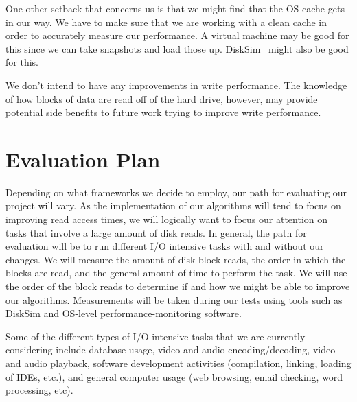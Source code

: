 \documentclass[letterpaper,twocolumn,10pt]{article}
\begin{document}
One other setback that concerns us is that we might find that the OS cache gets in our way.  We have to make sure that we are working with a clean cache in order to accurately measure our performance.  A virtual machine may be good for this since we can take snapshots and load those up.  DiskSim~\cite{DiskSimManual} might also be good for this.

We don't intend to have any improvements in write performance.  The knowledge of how blocks of data are read off of the hard drive, however, may provide potential side benefits to future work trying to improve write performance.

\section{Evaluation Plan}

Depending on what frameworks we decide to employ, our path for evaluating our project will vary.  As the implementation of our algorithms will tend to focus on improving read access times, we will logically want to focus our attention on tasks that involve a large amount of disk reads.  In general, the path for evaluation will be to run different I/O intensive tasks with and without our changes.  We will measure the amount of disk block reads, the order in which the blocks are read, and the general amount of time to perform the task.  We will use the order of the block reads to determine if and how we might be able to improve our algorithms.  Measurements will be taken during our tests using tools such as DiskSim and OS-level performance-monitoring software.

Some of the different types of I/O intensive tasks that we are currently considering include database usage, video and audio encoding/decoding, video and audio playback, software development activities (compilation, linking, loading of IDEs, etc.), and general computer usage (web browsing, email checking, word processing, etc).

{\footnotesize 
}
\end{document}
